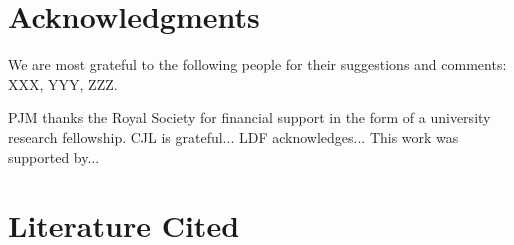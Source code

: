 \documentclass{ar2e}
\begin{document}

\section*{Acknowledgments}

We are most grateful to the following people for their suggestions and comments:
XXX, YYY, ZZZ. 

PJM thanks the Royal Society for financial support in the form of a university
research fellowship. 
%
CJL is grateful...
%
LDF acknowledges...
% 
This work was supported by...


\section{Literature Cited}





\end{document}

